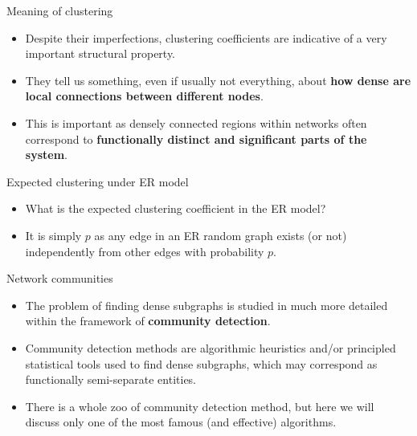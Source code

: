 \documentclass[
    hyperref={colorlinks,linkcolor=blue,urlcolor=blue,citecolor=blue}
]{beamer}
\begin{document}
\begin{frame}{Meaning of clustering}
\begin{itemize}
    \item<2-> Despite their imperfections, clustering coefficients are indicative
    of a very important structural property.
    \item<3-> They tell us something, even if usually not everything,
    about \textbf{how dense are local connections between different nodes}.
    \item<4-> This is important as densely connected regions within networks
    often correspond to \textbf{functionally distinct and significant parts
    of the system}.
\end{itemize}
\end{frame}

\begin{frame}{Expected clustering under ER model}
\begin{itemize}
    \item What is the expected clustering coefficient in the ER model?
\end{itemize}
\pause
\begin{center}
\end{center}
\pause
\begin{itemize}
    \item It is simply $p$ as any edge in an ER random graph exists (or not)
    independently from other edges with probability $p$.
\end{itemize}
\end{frame}

\begin{frame}{Network communities}
\begin{itemize}
    \item<2-> The problem of finding dense subgraphs is studied in much more
    detailed within the framework of \textbf{community detection}.
    \item<3-> Community detection methods are algorithmic heuristics and/or
    principled statistical tools used to find dense subgraphs, which may
    correspond as functionally semi-separate entities.
    \item<4-> There is a whole zoo of community detection method, but here
    we will discuss only one of the most famous (and effective) algorithms.
\end{itemize}
\end{frame}
\end{document}
